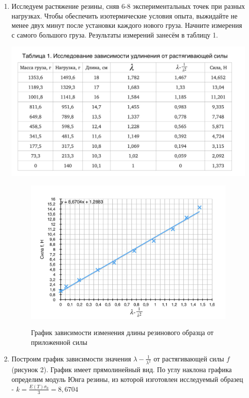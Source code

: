 \documentclass[a4paper]{article}
\begin{document}
\begin{enumerate}
    \item Исследуем растяжение резины, сняв 6-8 экспериментальных точек при разных нагрузках. Чтобы обеспечить изотермические условия опыта,
выжидайте не менее двух минут после установки каждого нового груза. Начните измерения с самого большого груза. Результаты измерений занесём в таблицу 1.

    \includegraphics[width=\textwidth]{table1.jpg}



\begin{figure}[h]
    \centering
    \caption{График зависимости изменения длины резинового образца от приложенной силы}
    \includegraphics[width=\textwidth]{graph1.jpg}
    \label{fig:vac}
\end{figure}

\item Построим график зависимости значения $\lambda - \frac{1}{\lambda^2}$ от растягивающей силы $f$ (рисунок 2). График имеет прямолинейный вид. По углу наклона графика определим модуль Юнга резины, из которой изготовлен исследуемый образец - $k = \frac{E(T)\sigma_0}{3} = 8,6704$


\end{enumerate}
\end{document}
